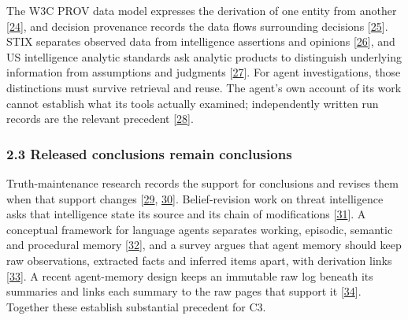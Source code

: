 \documentclass[
  11pt,
]{article}
\begin{document}
The W3C PROV data model expresses the derivation of one entity from
another {[}\protect\hyperlink{ref-W3C2013PROVDM}{24}{]}, and decision
provenance records the data flows surrounding decisions
{[}\protect\hyperlink{ref-Singh2019DecisionProvenance}{25}{]}. STIX
separates observed data from intelligence assertions and opinions
{[}\protect\hyperlink{ref-OASIS2021STIX}{26}{]}, and US intelligence
analytic standards ask analytic products to distinguish underlying
information from assumptions and judgments
{[}\protect\hyperlink{ref-ODNI2015ICD203}{27}{]}. For agent
investigations, those distinctions must survive retrieval and reuse. The
agent's own account of its work cannot establish what its tools actually
examined; independently written run records are the relevant precedent
{[}\protect\hyperlink{ref-Dai2026Hearsay}{28}{]}.

\hypertarget{released-conclusions-remain-conclusions}{%
\subsubsection{2.3 Released conclusions remain
conclusions}\label{released-conclusions-remain-conclusions}}

Truth-maintenance research records the support for conclusions and
revises them when that support changes
{[}\protect\hyperlink{ref-Doyle1979TMS}{29},
\protect\hyperlink{ref-Malheiro1994BeliefRevision}{30}{]}.
Belief-revision work on threat intelligence asks that intelligence state
its source and its chain of modifications
{[}\protect\hyperlink{ref-Hettema2021Rationality}{31}{]}. A conceptual
framework for language agents separates working, episodic, semantic and
procedural memory {[}\protect\hyperlink{ref-Sumers2024CoALA}{32}{]}, and
a survey argues that agent memory should keep raw observations,
extracted facts and inferred items apart, with derivation links
{[}\protect\hyperlink{ref-Wang2026AgentTraces}{33}{]}. A recent
agent-memory design keeps an immutable raw log beneath its summaries and
links each summary to the raw pages that support it
{[}\protect\hyperlink{ref-Zhu2026TierMem}{34}{]}. Together these
establish substantial precedent for C3.
\end{document}
